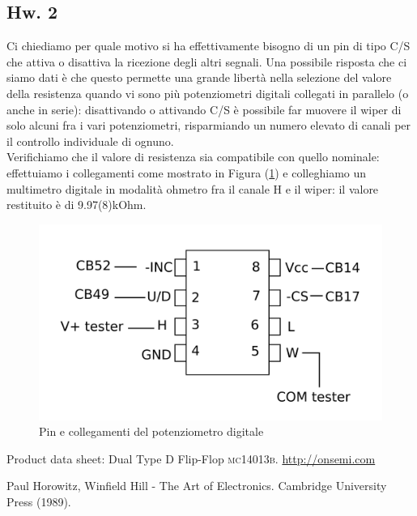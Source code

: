 \documentclass[journal, a4paper]{IEEEtran}
\begin{document}
\subsection{Hw. 2}
Ci chiediamo per quale motivo si ha effettivamente bisogno di un pin di tipo C/S che attiva o disattiva la ricezione degli altri segnali. Una possibile risposta che ci siamo dati è che questo permette una grande libertà nella selezione del valore della resistenza quando vi sono più potenziometri digitali collegati in parallelo (o anche in serie): disattivando o attivando C/S è possibile far muovere il wiper di solo alcuni fra i vari potenziometri, risparmiando un numero elevato di canali per il controllo individuale di ognuno.\\

Verifichiamo che il valore di resistenza sia compatibile con quello nominale: effettuiamo i collegamenti come mostrato in Figura (\ref{fig:es10circuit_export}) e colleghiamo un multimetro digitale in modalità ohmetro fra il canale H e il wiper: il valore restituito è di 9.97(8)kOhm.

\begin{figure}
\centering
\includegraphics[width=0.7\linewidth]{./es10circuit_export}
\caption{Pin e collegamenti del potenziometro digitale}
\label{fig:es10circuit_export}
\end{figure}


\begin{thebibliography}{5}

	
	Product data sheet: Dual Type D Flip-Flop \textsc{mc14013b}.
	\url{http://onsemi.com}

	Paul Horowitz, Winfield Hill - The Art of Electronics. Cambridge University Press (1989).
	
\end{thebibliography}
\end{document}
